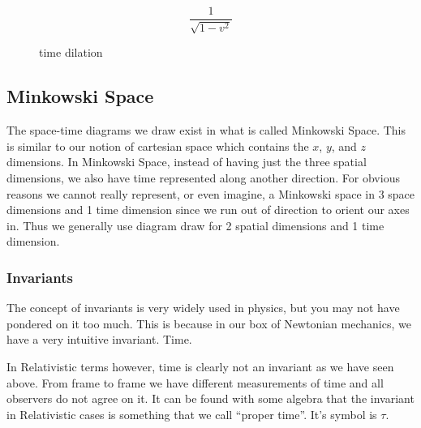 \documentclass[16pt]{scrartcl}
\numberwithin{equation}{section}
\theoremstyle{plain}
\theoremstyle{definition}
\begin{document}
\begin{equation}
    \frac{1}{\sqrt{1-v^2}}
    \label{eq:time-formula}
\end{equation}


\begin{figure}
    \centering
    \caption{time dilation}
    \label{fig:time-dilation}
\end{figure}

\subsection{Minkowski Space}

The space-time diagrams we draw exist in what is called Minkowski Space. This is similar to our notion of cartesian space which contains the $x$, $y$, and $z$ dimensions. In Minkowski Space, instead of having just the three spatial dimensions, we also have time represented along another direction. For obvious reasons we cannot really represent, or even imagine, a Minkowski space in 3 space dimensions and 1 time dimension since we run out of direction to orient our axes in. Thus we generally use diagram draw for 2 spatial dimensions and 1 time dimension. 

\subsubsection*{Invariants}

The concept of invariants is very widely used in physics, but you may not have pondered on it too much. This is because in our box of Newtonian mechanics, we have a very intuitive invariant. Time. 

In Relativistic terms however, time is clearly not an invariant as we have seen above. From frame to frame we have different measurements of time and all observers do not agree on it. It can be found with some algebra that the invariant in Relativistic cases is something that we call ``proper time''. It's symbol is $\tau$.
\end{document}
